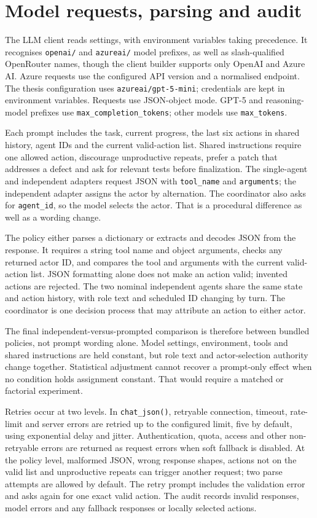 \documentclass[12pt,a4paper,oneside]{report}
\begin{document}
\section{Model requests, parsing and audit}
The LLM client reads settings, with environment variables taking precedence. It recognises \texttt{openai/} and \texttt{azureai/} model prefixes, as well as slash-qualified OpenRouter names, though the client builder supports only OpenAI and Azure AI. Azure requests use the configured API version and a normalised endpoint. The thesis configuration uses \texttt{azureai/gpt-5-mini}; credentials are kept in environment variables. Requests use JSON-object mode. GPT-5 and reasoning-model prefixes use \texttt{max\allowbreak\_completion\allowbreak\_tokens}; other models use \texttt{max\allowbreak\_tokens}.

Each prompt includes the task, current progress, the last six actions in shared history, agent IDs and the current valid-action list. Shared instructions require one allowed action, discourage unproductive repeats, prefer a patch that addresses a defect and ask for relevant tests before finalization. The single-agent and independent adapters request JSON with \texttt{tool\allowbreak\_name} and \texttt{arguments}; the independent adapter assigns the actor by alternation. The coordinator also asks for \texttt{agent\allowbreak\_id}, so the model selects the actor. That is a procedural difference as well as a wording change.

The policy either parses a dictionary or extracts and decodes JSON from the response. It requires a string tool name and object arguments, checks any returned actor ID, and compares the tool and arguments with the current valid-action list. JSON formatting alone does not make an action valid; invented actions are rejected. The two nominal independent agents share the same state and action history, with role text and scheduled ID changing by turn. The coordinator is one decision process that may attribute an action to either actor.

The final independent-versus-prompted comparison is therefore between bundled policies, not prompt wording alone. Model settings, environment, tools and shared instructions are held constant, but role text and actor-selection authority change together. Statistical adjustment cannot recover a prompt-only effect when no condition holds assignment constant. That would require a matched or factorial experiment.

Retries occur at two levels. In \texttt{chat\allowbreak\_json()}, retryable connection, timeout, rate-limit and server errors are retried up to the configured limit, five by default, using exponential delay and jitter. Authentication, quota, access and other non-retryable errors are returned as request errors when soft fallback is disabled. At the policy level, malformed JSON, wrong response shapes, actions not on the valid list and unproductive repeats can trigger another request; two parse attempts are allowed by default. The retry prompt includes the validation error and asks again for one exact valid action. The audit records invalid responses, model errors and any fallback responses or locally selected actions.
\end{document}
